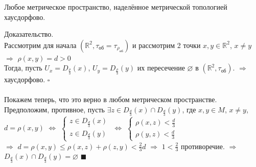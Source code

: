 \begin{lemma}
Любое метрическое пространство, наделённое метрической топологией хаусдорфово.

Доказательство.\\
Рассмотрим для начала $(\mathbb{R}^2,\tau_{\text{об}}=\tau_{\rho_{\text{об}}})$ и рассмотрим 2 точки $x,y{\in}\mathbb{R}^2$, $x{\neq}y$ $\Rightarrow$ $\rho(x,y)=d>0$\\
Тогда, пусть $U_x=D_{\frac{\rho}{3}}(x)$, $U_{y}=D_{\frac{\rho}{3}}(y)$ их пересечение $\varnothing$ в $(\mathbb{R}^2,\tau_{\text{об}})$. $\Rightarrow$ хаусдорфово. $\square$\\\\
Покажем теперь, что это верно в любом метрическом пространстве.\\ Предположим, противное, пусть $\exists z{\in}D_{\frac{d}{3}}(x){\cap}D_{\frac{d}{3}}(y)$, где $x,y{\in}M$, $x{\neq}y$, \\$d=\rho(x,y)$ $\Leftrightarrow$ $\begin{cases}
z{\in}D_{\frac{d}{3}}(x)\\
z{\in}D_{\frac{d}{3}}(y)
\end{cases}$ $\Leftrightarrow$ $\begin{cases}
\rho(x,z)<\frac{d}{3}\\
\rho(y,z)<\frac{d}{3}
\end{cases}$\\
$\Rightarrow$ $d=\rho(x,y){\leq}\rho(x,z)+\rho(z,y)<\frac{2}{3}d$ $\Rightarrow$ $1<\frac{2}{3}$ противоречие. $\Rightarrow$ $D_{\frac{d}{3}}(x){\cap}D_{\frac{d}{3}}(y)=\varnothing$ $\blacksquare$
\end{lemma}


